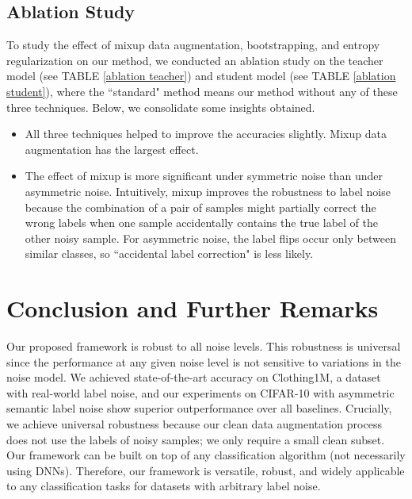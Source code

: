 \documentclass[conference]{IEEEtran}
\begin{document}
\begin{algorithm}[H]
\subsection{Ablation Study}
\label{ablation study}
To study the effect of mixup data augmentation, bootstrapping, and entropy regularization on our method, we conducted an ablation study on the teacher model (see TABLE \ref{ablation teacher}) and student model (see TABLE \ref{ablation student}), where the ``standard" method means our method without any of these three techniques. Below, we consolidate some insights obtained.

\begin{itemize}
\item All three techniques helped to improve the accuracies slightly. Mixup data augmentation has the largest effect.
\item The effect of mixup is more significant under symmetric noise than under asymmetric noise. Intuitively, mixup improves the robustness to label noise because the combination of a pair of samples might partially correct the wrong labels when one sample accidentally contains the true label of the other noisy sample. For asymmetric noise, the label flips occur only between similar classes, so ``accidental label correction" is less likely.
\end{itemize}
  







\section{Conclusion and Further Remarks}
Our proposed framework is robust to all noise levels. This robustness is universal since the performance at any given noise level is not sensitive to variations in the noise model. 
We achieved state-of-the-art accuracy on Clothing1M, a dataset with real-world label noise, and our experiments on CIFAR-10 with asymmetric semantic label noise show superior outperformance over all baselines. 
Crucially, we achieve universal robustness because our clean data augmentation process does not use the labels of noisy samples; we only require a small clean subset. 
Our framework can be built on top of any classification algorithm (not necessarily using DNNs). Therefore, our framework is versatile, robust, and widely applicable to any classification tasks for datasets with arbitrary label noise.




\end{algorithm}
\end{document}

